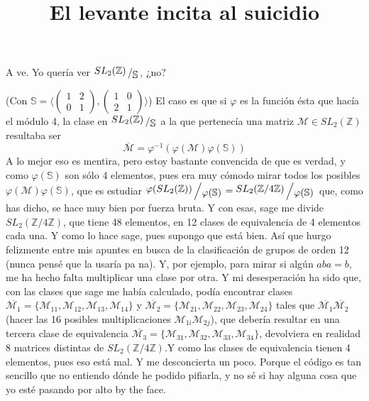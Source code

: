 \documentclass{article}
\title{El levante incita al suicidio}
\date{}
\newcommand\tab[1][0.6cm]{\hspace*{#1}}
\newcommand\nl{\newline\tab}
\newcommand{\bigslant}[2]{{\raisebox{.2em}{$#1$}\left/\raisebox{-.2em}{$#2$}\right.}}
\begin{document}
	\maketitle
	A ve.\nl 
	Yo quería ver $ \bigslant{SL_2(\mathbb{Z})}{\mathbb{S}}$, ¿no?  
	
	(Con $\mathbb{S} = 
	\langle
	\begin{pmatrix}
	1 & 2 \\
	0 & 1 
	\end{pmatrix},
	\begin{pmatrix}
	1 & 0 \\
	2 & 1 
	\end{pmatrix}
	\rangle $)
	\nl
	El caso es que si $\varphi$ es la función ésta que hacía el módulo 4, la clase en  
	$ \bigslant{SL_2(\mathbb{Z})}{\mathbb{S}} $ a la que pertenecía una matriz $\mathcal{M} \in SL_2(\mathbb{Z})$ resultaba ser
	$$ 
	\overline{\mathcal{M}} = \varphi^{-1}\left( \varphi(\mathcal{M})\varphi(\mathbb{S})\right)
	$$
	\tab A lo mejor eso es mentira, pero estoy bastante convencida de que es verdad, y como $\varphi(\mathbb{S})$ son sólo 4 elementos, pues era muy cómodo mirar todos los posibles $ \varphi(\mathcal{M})\varphi(\mathbb{S}) $, que es estudiar $ \bigslant{ \varphi(SL_2(\mathbb{Z}))}{ \varphi(\mathbb{S}) } =  \bigslant{SL_2(\mathbb{Z}/4\mathbb{Z})}{ \varphi(\mathbb{S}) }$ que, como has dicho, se hace muy bien por fuerza bruta.\nl
	Y con esas, sage me divide $ SL_2(\mathbb{Z}/4\mathbb{Z}) $, que tiene 48 elementos, en 12 clases de equivalencia de 4 elementos cada una. Y como lo hace sage, pues supongo que está bien. \nl 
	Así que hurgo felizmente entre mis apuntes en busca de la clasificación de grupos de orden 12 (nunca pensé que la usaría pa na).\nl 
	Y, por ejemplo, para mirar si algún $aba = b$, me ha hecho falta multiplicar una clase por otra.\nl
	Y mi desesperación ha sido que, con las clases que sage me había calculado, podía encontrar clases $\overline{\mathcal{M}_1} = \{ \mathcal{M}_{11}, \mathcal{M}_{12}, \mathcal{M}_{13}, \mathcal{M}_{14} \}$  y $\overline{\mathcal{M}_2} = \{ \mathcal{M}_{21}, \mathcal{M}_{22}, \mathcal{M}_{23}, \mathcal{M}_{24} \}$ tales que $\overline{\mathcal{M}_1}\overline{\mathcal{M}_2}$ (hacer las 16 posibles multiplicaciones $\mathcal{M}_{1i}\mathcal{M}_{2j}$), que debería resultar en una tercera clase de equivalencia $\overline{\mathcal{M}_3} = \{ \mathcal{M}_{31}, \mathcal{M}_{32}, \mathcal{M}_{33}, \mathcal{M}_{34} \}$, devolviera en realidad 8 matrices distintas de $SL_2(\mathbb{Z}/4\mathbb{Z})$.\nl Y como las clases de equivalencia tienen 4 elementos, pues eso está mal. Y me desconcierta un poco.\nl 
	Porque el código es tan sencillo que no entiendo dónde he podido pifiarla, y no sé si hay alguna cosa que yo esté pasando por alto by the face. 
	
\end{document}
